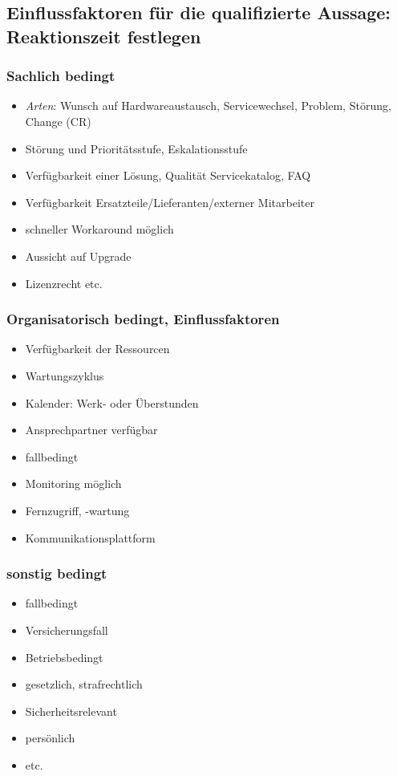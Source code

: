 \documentclass[a4paper, 12pt]{report}
\begin{document}
\begin{multicols}{2}
\subsection{Einflussfaktoren für die qualifizierte Aussage: Reaktionszeit 
festlegen}

\subsubsection{Sachlich bedingt}

\begin{itemize}
	\item \emph{Arten}: Wunsch auf Hardwareaustausch, Servicewechsel, 
		Problem, Störung, Change (CR)
	\item Störung und Prioritätsstufe, Eskalationsstufe
	\item Verfügbarkeit einer Lösung, Qualität Servicekatalog, FAQ
	\item Verfügbarkeit Ersatzteile/Lieferanten/externer Mitarbeiter
	\item schneller Workaround möglich
	\item Aussicht auf Upgrade
	\item Lizenzrecht etc. 
\end{itemize}

\subsubsection{Organisatorisch bedingt, Einflussfaktoren}

\begin{itemize}
	\item Verfügbarkeit der Ressourcen
	\item Wartungszyklus
	\item Kalender: Werk- oder Überstunden
	\item Ansprechpartner verfügbar
	\item fallbedingt
	\item Monitoring möglich
	\item Fernzugriff, -wartung
	\item Kommunikationsplattform
\end{itemize}

\subsubsection{sonstig bedingt}

\begin{itemize}
	\item fallbedingt
	\item Versicherungsfall
	\item Betriebsbedingt
	\item gesetzlich, strafrechtlich
	\item Sicherheitsrelevant
	\item persönlich
	\item etc. 
\end{itemize}

\end{multicols}
\end{document}
